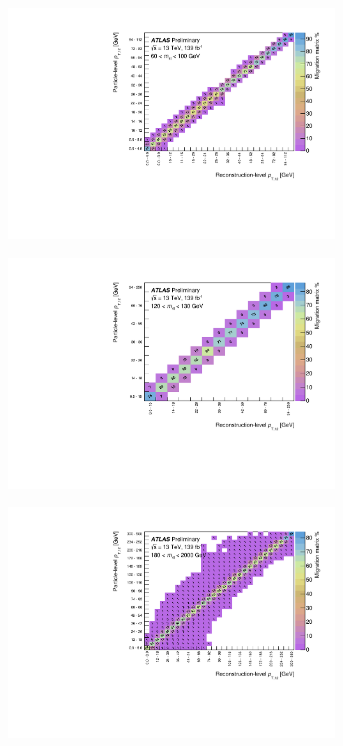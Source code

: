 \begin{figure}[htb]
  \centering
  \begin{subfigure}{.49\textwidth}\centering\includegraphics[width = 0.95\textwidth]{Figures/m4l/UnfoldingStudies/v014_matrices/pt12_m4l60-100Matrix.pdf}\end{subfigure}
  \begin{subfigure}{.49\textwidth}\centering\includegraphics[width = 0.95\textwidth]{Figures/m4l/UnfoldingStudies/v014_matrices/pt12_m4l120-130Matrix.pdf}\end{subfigure}
  \begin{subfigure}{.49\textwidth}\centering\includegraphics[width = 0.95\textwidth]{Figures/m4l/UnfoldingStudies/v014_matrices/pt12_m4l180-2000Matrix.pdf}\end{subfigure}

\end{figure}
